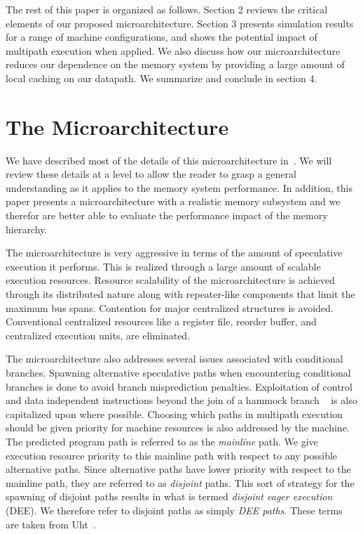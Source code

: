 \documentclass[10pt,twocolumn,dvips]{article}
\begin{document}
The rest of this paper is organized as follows.
Section 2 reviews the critical elements
of our proposed microarchitecture.
Section 3 presents simulation results for a range of
machine configurations, and shows the potential
impact of multipath execution when applied.
We also discuss how our microarchitecture reduces
our dependence on the memory system by providing a large
amount of local caching on our datapath. 
We summarize and conclude in section 4.
%
%
\section{The Microarchitecture}
%
We have described most of the details of this microarchitecture
in~\cite{EPAR}.   We will review these details at a level to allow
the reader to grasp a general understanding as it applies to the
memory system performance. 
In addition, this paper presents a microarchitecture with a realistic 
memory subsystem and we therefor are better able to
evaluate the performance impact of the memory hierarchy.

The microarchitecture is very aggressive in terms of
the amount of speculative execution it performs.
This is realized through a large amount of scalable execution
resources.
Resource scalability
of the microarchitecture is achieved through its distributed nature
along with repeater-like components that limit the maximum bus
spans.
Contention for major centralized structures is avoided.
Conventional centralized resources like a register file,
reorder buffer, and centralized execution units, are eliminated.

The microarchitecture also 
addresses several issues associated with conditional branches.
Spawning alternative speculative paths when encountering conditional
branches is done to avoid branch misprediction penalties.
Exploitation of control
and data independent instructions beyond the join of a 
hammock branch ~\cite{Fer87,Uht86}
is also capitalized upon where possible.
Choosing which paths in multipath execution should
be given priority for machine resources is also addressed
by the machine.
The predicted program path is referred to as the {\em mainline} path.  
We give execution resource priority to this mainline path with respect
to any possible alternative paths.
Since alternative paths have lower priority with
respect to the mainline path, they are referred
to as {\em disjoint} paths.  
This sort of strategy for the spawning of disjoint 
paths results in what is termed {\em disjoint eager execution} (DEE).
We therefore refer to disjoint paths as simply {\em DEE paths}.
These terms are taken from Uht~\cite{Uht95}.
\end{document}
